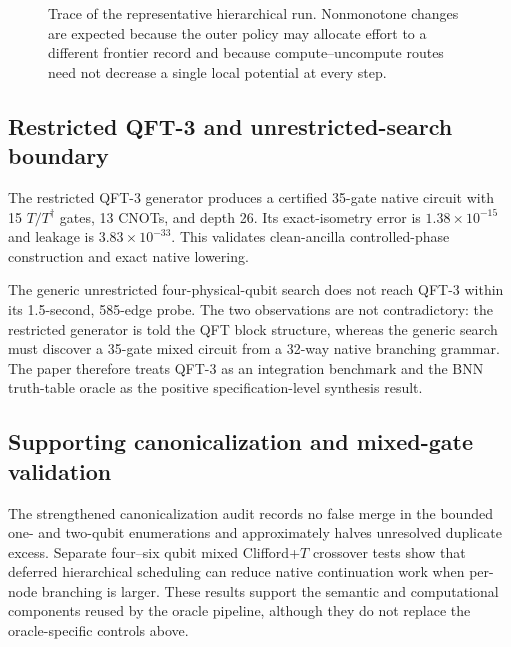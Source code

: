 \begin{figure}[t]
\centering
{}
\caption{Trace of the representative hierarchical run.  Nonmonotone changes are expected because the outer policy may allocate effort to a different frontier record and because compute--uncompute routes need not decrease a single local potential at every step.}
\label{fig:oracle-trace}
\end{figure}

\subsection{Restricted QFT-3 and unrestricted-search boundary}

The restricted QFT-3 generator produces a certified 35-gate native circuit with 15 $T/T^\dagger$ gates, 13 CNOTs, and depth 26.  Its exact-isometry error is $1.38\times10^{-15}$ and leakage is $3.83\times10^{-33}$.  This validates clean-ancilla controlled-phase construction and exact native lowering.

The generic unrestricted four-physical-qubit search does not reach QFT-3 within its 1.5-second, 585-edge probe.  The two observations are not contradictory: the restricted generator is told the QFT block structure, whereas the generic search must discover a 35-gate mixed circuit from a 32-way native branching grammar.  The paper therefore treats QFT-3 as an integration benchmark and the BNN truth-table oracle as the positive specification-level synthesis result.

\subsection{Supporting canonicalization and mixed-gate validation}

The strengthened canonicalization audit records no false merge in the bounded one- and two-qubit enumerations and approximately halves unresolved duplicate excess.  Separate four--six qubit mixed Clifford+$T$ crossover tests show that deferred hierarchical scheduling can reduce native continuation work when per-node branching is larger.  These results support the semantic and computational components reused by the oracle pipeline, although they do not replace the oracle-specific controls above.
